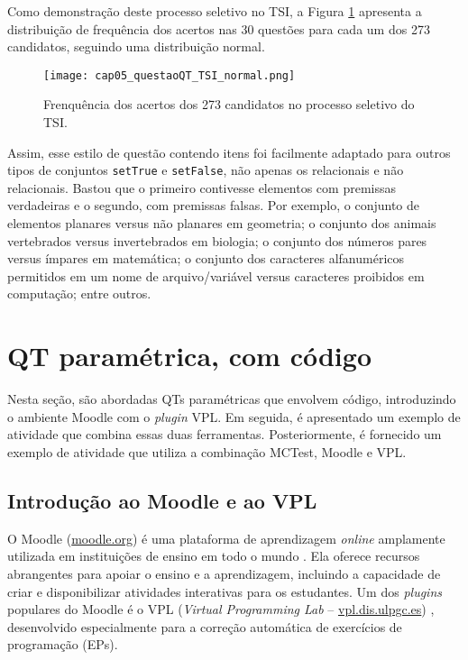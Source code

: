 Como demonstração deste processo seletivo no TSI, a Figura \ref{fig:cap05_questaoQT_TSI_normal} apresenta a distribuição de frequência dos acertos nas 30 questões para cada um dos 273 candidatos, seguindo uma distribuição normal.

\begin{figure}[!ht]
  \texttt{[image: cap05\_questaoQT\_TSI\_normal.png]}
  \caption{Frenquência dos acertos dos 273 candidatos no processo seletivo do TSI.}
  \label{fig:cap05_questaoQT_TSI_normal}
\end{figure}

Assim, esse estilo de questão contendo itens foi facilmente adaptado para outros tipos de conjuntos \verb|setTrue| e \verb|setFalse|, não apenas os relacionais e não relacionais. Bastou que o primeiro contivesse elementos com premissas verdadeiras e o segundo, com premissas falsas. Por exemplo, o conjunto de elementos planares versus não planares em geometria; o conjunto dos animais vertebrados versus invertebrados em biologia; o conjunto dos números pares versus ímpares em matemática; o conjunto dos caracteres alfanuméricos permitidos em um nome de arquivo/variável versus caracteres proibidos em computação; entre outros.

\section{QT paramétrica, com código}\label{sec:questoesQT_VPL}

Nesta seção, são abordadas QTs paramétricas que envolvem código, introduzindo o ambiente Moodle com o \textit{plugin} VPL. Em seguida, é apresentado um exemplo de atividade que combina essas duas ferramentas. Posteriormente, é fornecido um exemplo de atividade que utiliza a combinação MCTest, Moodle e VPL.

\subsection{Introdução ao Moodle e ao VPL}

O Moodle (\href{www.moodle.org}{moodle.org}) é uma plataforma de aprendizagem \textit{online} amplamente utilizada em instituições de ensino em todo o mundo \cite{presedo2015calibracion}. Ela oferece recursos abrangentes para apoiar o ensino e a aprendizagem, incluindo a capacidade de criar e disponibilizar atividades interativas para os estudantes. Um dos \textit{plugins} populares do Moodle é o VPL (\textit{Virtual Programming Lab} -- \href{https://vpl.dis.ulpgc.es/}{vpl.dis.ulpgc.es}) \cite{rodriguez2012virtual}, desenvolvido especialmente para a correção automática de exercícios de programação (EPs).


